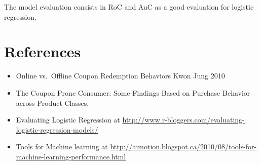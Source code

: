 \documentclass[]{article}
\begin{document}
The model evaluation consists in RoC and AuC as a good evaluation for
logistic regression.

\section{References}\label{references}

\begin{itemize}
\item
  Online vs.~Offline Coupon Redemption Behaviors Kwon Jung 2010
\item
  The Coupon Prone Consumer: Some Findings Based on Purchase Behavior
  across Product Classes.
\item
  Evaluating Logistic Regression at
  \url{http://www.r-bloggers.com/evaluating-logistic-regression-models/}
\item
  Tools for Machine learning at
  \url{http://aimotion.blogspot.ca/2010/08/tools-for-machine-learning-performance.html}
\end{itemize}
\end{document}
